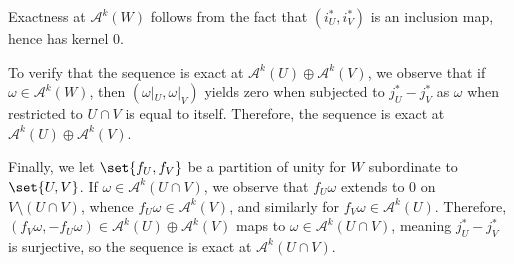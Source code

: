 \documentclass[10pt]{mypackage}
\begin{document}
\begin{solution}
  Exactness at $\mathcal{A}^{k}\left( W \right)$ follows from the fact that $\left( i_U^{\ast},i_V^{\ast} \right)$ is an inclusion map, hence has kernel $0$.\newline

  To verify that the sequence is exact at $\mathcal{A}^{k}\left( U \right)\oplus \mathcal{A}^{k}\left( V \right)$, we observe that if $\omega\in \mathcal{A}^{k}\left( W \right)$, then $\left( \omega|_{U},\omega|_{V} \right)$ yields zero when subjected to $j_U^{\ast}-j_V^{\ast}$ as $\omega$ when restricted to $U\cap V$ is equal to itself. Therefore, the sequence is exact at $\mathcal{A}^{k}\left( U \right)\oplus \mathcal{A}^{k}\left( V \right)$.\newline

  Finally, we let $\set{f_U,f_V}$ be a partition of unity for $W$ subordinate to $\set{U,V}$. If $\omega\in \mathcal{A}^{k}\left( U\cap V \right)$, we observe that $f_U\omega$ extends to $0$ on $V\setminus \left( U\cap V \right)$, whence $f_U\omega\in \mathcal{A}^{k}\left( V \right)$, and similarly for $f_V\omega\in \mathcal{A}^{k}\left( U \right)$. Therefore, $\left( f_V\omega,-f_U\omega \right)\in \mathcal{A}^{k}\left( U \right)\oplus \mathcal{A}^{k}\left( V \right)$ maps to $\omega\in \mathcal{A}^{k}\left( U\cap V \right)$, meaning $j_U^{\ast}-j_V^{\ast}$ is surjective, so the sequence is exact at $\mathcal{A}^{k}\left( U\cap V \right)$.
\end{solution}
\end{document}
